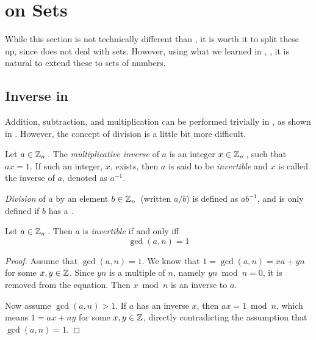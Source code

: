 \section{ on Sets}\label{sec:Number_Theory_on_Sets}
While this section is not technically different than , it is worth it to split these up, since  does not deal with sets.
However, using what we learned in , , it is natural to extend these to sets of numbers.



\subsection{\texorpdfstring{Inverse in \TextIntsModN{}}{Inverse in Integers Modulo n}}\label{subsec:Inverse_Z_mod_n}
Addition, subtraction, and multiplication can be performed trivially in \TextIntsModN{}, as shown in .
However, the concept of division is a little bit more difficult.
\begin{definition}\label{def:Multiplicative_Inverse}
  Let $a \in \operatorname{\mathbb{Z}}_{n}{}$.
  The \emph{multiplicative inverse} of $a$ is an integer $x \in \operatorname{\mathbb{Z}}_{n}{}$, such that $ax = 1$.
  If such an integer, $x$, exists, then $a$ is said to be \emph{invertible} and $x$ is called the inverse of $a$, denoted as $a^{-1}$.
\end{definition}

\begin{definition}\label{def:Division_Z_mod_n}
  \emph{Division} of $a$ by an element $b \in \operatorname{\mathbb{Z}}_{n}{}$ (written $a/b$) is defined as $ab^{-1}$, and is only defined if $b$ has a .
\end{definition}

\begin{definition}[Invertible]\label{def:Invertible}
  Let $a \in \operatorname{\mathbb{Z}}_{n}{}$.
  Then $a$ is \emph{invertible} if and only iff
  \begin{equation}\label{eq:Invertible}
    \gcd(a, n) = 1
  \end{equation}
\end{definition}

\begin{proof}
  Assume that $\gcd(a, n) = 1$.
  We know that $1 = \gcd(a, n) = xa + yn$ for some $x, y \in \operatorname{\mathbb{Z}}$.
  Since $yn$ is a multiple of $n$, namely $yn \bmod n = 0$, it is removed from the equation.
  Then $x \bmod n$ is an inverse to $a$.

  Now assume $\gcd(a, n) > 1$.
  If $a$ has an inverse $x$, then $ax = 1 \bmod n$, which means $1 = ax + ny$ for some $x, y \in \operatorname{\mathbb{Z}}$, directly contradicting the assumption that $\gcd(a, n) = 1$.
\end{proof}

